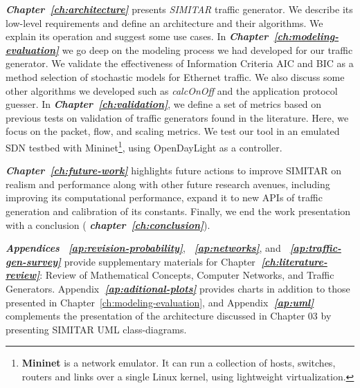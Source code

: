\textit{\textbf{Chapter~\ref{ch:architecture}}} presents \textit{SIMITAR} traffic generator. We describe its low-level requirements and define an architecture and their algorithms.  We explain its operation and suggest some use cases. In \textit{\textbf{Chapter~\ref{ch:modeling-evaluation}}} we go deep on the modeling process we had developed for our traffic generator. We validate the effectiveness of Information Criteria \acrshort{AIC} and \acrshort{BIC} as a method selection of stochastic models for  Ethernet traffic.  We also discuss some other algorithms we developed such as \textit{calcOnOff} and the application protocol guesser. In \textit{\textbf{Chapter~\ref{ch:validation}}}, we define a set of metrics based on previous tests on validation of traffic generators found in the literature. Here, we focus on the packet, flow, and scaling metrics. We test our tool in an emulated SDN testbed with Mininet\cite{web-mininet}\footnote{\textbf{Mininet} is a network emulator. It can run a collection of  hosts, switches, routers and links over a single Linux kernel, using lightweight virtualization\cite{web-mininet-repo}.}, using OpenDayLight\cite{web-opendaylight} as a controller. 

\textit{\textbf{Chapter~\ref{ch:future-work}}}  highlights future actions to improve SIMITAR on realism and performance along with other future research avenues, including improving its computational performance, expand it to new APIs of traffic generation and calibration of its constants. Finally, we end the work presentation with a conclusion ( \textit{\textbf{chapter~\ref{ch:conclusion}}}).

\textit{\textbf{Appendices}} \textit{\textbf{~\ref{ap:revision-probability}}}, \textit{\textbf{~\ref{ap:networks}}}, and \textit{\textbf{~\ref{ap:traffic-gen-survey}}} provide supplementary materials for Chapter\textit{\textbf{~\ref{ch:literature-review}}}: Review of Mathematical Concepts, Computer Networks, and Traffic Generators. Appendix\textit{\textbf{~\ref{ap:aditional-plots}}} provides charts in addition to those presented in Chapter~\ref{ch:modeling-evaluation}, and Appendix\textit{\textbf{~\ref{ap:uml}}} complements the presentation of the architecture discussed in Chapter 03 by presenting SIMITAR  UML class-diagrams.